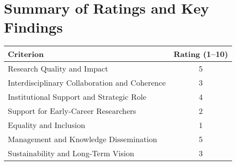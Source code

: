 \documentclass{article}
\begin{document}
\section{Summary of Ratings and Key Findings}

\begin{center}
    \begin{tabular}{|l|c|}
    \hline
    \textbf{Criterion} & \textbf{Rating (1–10)} \\
    \hline
    Research Quality and Impact & 5 \\
    Interdisciplinary Collaboration and Coherence & 3 \\
    Institutional Support and Strategic Role & 4 \\
    Support for Early-Career Researchers & 2 \\
    Equality and Inclusion & 1 \\
    Management and Knowledge Dissemination & 5 \\
    Sustainability and Long-Term Vision & 3 \\
    \hline
    \end{tabular}
\end{center}
\end{document}

